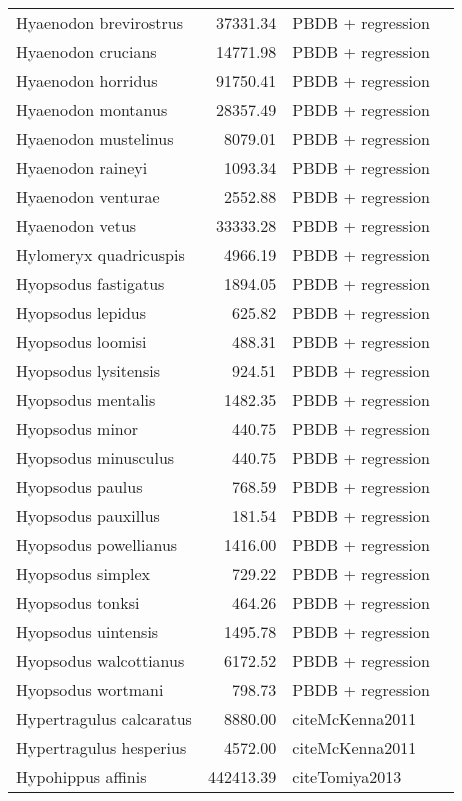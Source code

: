 \begin{table}[ht]
\begin{tabular}{lrll}
  Hyaenodon brevirostrus & 37331.34 & PBDB + regression &  \\ 
  Hyaenodon crucians & 14771.98 & PBDB + regression &  \\ 
  Hyaenodon horridus & 91750.41 & PBDB + regression &  \\ 
  Hyaenodon montanus & 28357.49 & PBDB + regression &  \\ 
  Hyaenodon mustelinus & 8079.01 & PBDB + regression &  \\ 
  Hyaenodon raineyi & 1093.34 & PBDB + regression &  \\ 
  Hyaenodon venturae & 2552.88 & PBDB + regression &  \\ 
  Hyaenodon vetus & 33333.28 & PBDB + regression &  \\ 
  Hylomeryx quadricuspis & 4966.19 & PBDB + regression &  \\ 
  Hyopsodus fastigatus & 1894.05 & PBDB + regression &  \\ 
  Hyopsodus lepidus & 625.82 & PBDB + regression &  \\ 
  Hyopsodus loomisi & 488.31 & PBDB + regression &  \\ 
  Hyopsodus lysitensis & 924.51 & PBDB + regression &  \\ 
  Hyopsodus mentalis & 1482.35 & PBDB + regression &  \\ 
  Hyopsodus minor & 440.75 & PBDB + regression &  \\ 
  Hyopsodus minusculus & 440.75 & PBDB + regression &  \\ 
  Hyopsodus paulus & 768.59 & PBDB + regression &  \\ 
  Hyopsodus pauxillus & 181.54 & PBDB + regression &  \\ 
  Hyopsodus powellianus & 1416.00 & PBDB + regression &  \\ 
  Hyopsodus simplex & 729.22 & PBDB + regression &  \\ 
  Hyopsodus tonksi & 464.26 & PBDB + regression &  \\ 
  Hyopsodus uintensis & 1495.78 & PBDB + regression &  \\ 
  Hyopsodus walcottianus & 6172.52 & PBDB + regression &  \\ 
  Hyopsodus wortmani & 798.73 & PBDB + regression &  \\ 
  Hypertragulus calcaratus & 8880.00 & cite{McKenna2011} &  \\ 
  Hypertragulus hesperius & 4572.00 & cite{McKenna2011} &  \\ 
  Hypohippus affinis & 442413.39 & cite{Tomiya2013} &  \\ 

\end{tabular}
\end{table}
